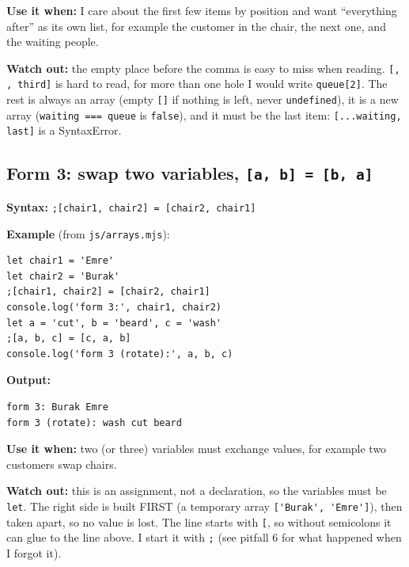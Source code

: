 \textbf{Use it when:} I care about the first few items by position and want ``everything after'' as its own list,
for example the customer in the chair, the next one, and the waiting people.

\textbf{Watch out:} the empty place before the comma is easy to miss when reading. \passthrough{\lstinline![, , third]!} is hard to read,
for more than one hole I would write \passthrough{\lstinline!queue[2]!}. The rest is always an array (empty \passthrough{\lstinline![]!} if nothing is left,
never \passthrough{\lstinline!undefined!}), it is a new array (\passthrough{\lstinline!waiting === queue!} is \passthrough{\lstinline!false!}), and it must be the last item:
\passthrough{\lstinline![...waiting, last]!} is a SyntaxError.

\subsection{\texorpdfstring{Form 3: swap two variables, \texttt{{[}a,\ b{]}\ =\ {[}b,\ a{]}}}{Form 3: swap two variables, {[}a, b{]} = {[}b, a{]}}}\label{form-3-swap-two-variables-a-b-b-a}

\textbf{Syntax:} \passthrough{\lstinline!;[chair1, chair2] = [chair2, chair1]!}

\textbf{Example} (from \passthrough{\lstinline!js/arrays.mjs!}):

\begin{lstlisting}
let chair1 = 'Emre'
let chair2 = 'Burak'
;[chair1, chair2] = [chair2, chair1]
console.log('form 3:', chair1, chair2)
let a = 'cut', b = 'beard', c = 'wash'
;[a, b, c] = [c, a, b]
console.log('form 3 (rotate):', a, b, c)
\end{lstlisting}

\textbf{Output:}

\begin{lstlisting}
form 3: Burak Emre
form 3 (rotate): wash cut beard
\end{lstlisting}

\textbf{Use it when:} two (or three) variables must exchange values, for example two customers swap chairs.

\textbf{Watch out:} this is an assignment, not a declaration, so the variables must be \passthrough{\lstinline!let!}.
The right side is built FIRST (a temporary array \passthrough{\lstinline!['Burak', 'Emre']!}), then taken apart, so no value is lost.
The line starts with \passthrough{\lstinline![!}, so without semicolons it can glue to the line above. I start it with \passthrough{\lstinline!;!}
(see pitfall 6 for what happened when I forgot it).

